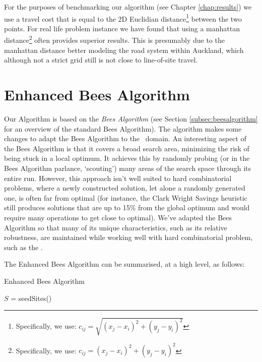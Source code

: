 For the purposes of benchmarking our algorithm (see Chapter \ref{chap:results}) we use a travel cost that is equal to the 2D Euclidian distance\footnote{Specifically, we use: $c_{ij} = \sqrt{(x_j-x_i)^2 + (y_j-y_i)^2}$} between the two points. For real life problem instance we have found that using a manhattan distance\footnote{Specifically, we use: $c_{ij} = (x_j-x_i)^2 + (y_j-y_i)^2$} often provides superior results. This is presumably due to the manhattan distance better modeling the road system within Auckland, which although not a strict grid still is not close to line-of-site travel.

\section{Enhanced Bees Algorithm}
\label{sec:enhancedbeesalgorithm}

Our Algorithm is based on the \emph{Bees Algorithm} (see Section \ref{subsec:beesalgorithm} for an overview of the standard Bees Algorithm). The algorithm makes some changes to adapt the Bees Algorithm to the \VRP\ domain. An interesting aspect of the Bees Algorithm is that it covers a broad search area, minimizing the risk of being stuck in a local optimum. It achieves this by randomly probing (or in the Bees Algorithm parlance, `scouting') many areas of the search space through its entire run. However, this approach isn't well suited to hard combinatorial problems, where a newly constructed solution, let alone a randomly generated one, is often far from optimal (for instance, the Clark Wright Savings heuristic still produces solutions that are up to 15\% from the global optimum and would require many operations to get close to optimal). We've adapted the Bees Algorithm so that many of its unique characteristics, such as its relative robustness, are maintained while working well with hard combinatorial problem, such as the \VRP.

The Enhanced Bees Algorithm can be summarised, at a high level, as follows:

\begin{algorithm}[H]
   \caption{Enhanced Bees Algorithm}
   $S$ = seedSites() \\

\end{algorithm}

